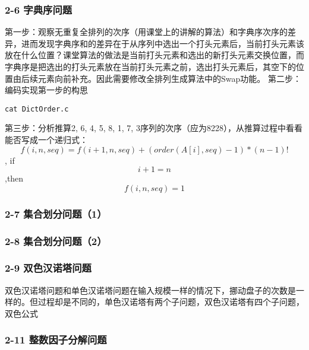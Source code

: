 \documentclass[11pt]{article}
\begin{document}
\subsubsection{2-6 字典序问题}
\label{sec-1-2-4}
    第一步：观察无重复全排列的次序（用课堂上的讲解的算法）和字典序次序的差异，进而发现字典序和的差异在于从序列中选出一个打头元素后，当前打头元素该放在什么位置？课堂算法的做法是当前打头元素和选出的新打头元素交换位置，而字典序是把选出的打头元素放在当前打头元素之前，选出打头元素后，其空下的位置由后续元素向前补充。因此需要修改全排列生成算法中的Swap功能。
第二步：编码实现第一步的构思
\begin{verbatim}
cat DictOrder.c
\end{verbatim}
第三步：分析推算2, 6, 4, 5, 8, 1, 7, 3序列的次序（应为8228），从推算过程中看看能否写成一个递归式：\[ f(i, n, seq) = f(i + 1, n, seq) + (order(A[i], seq) - 1) * (n - 1)!\], if \[i + 1 = n\] ,then \[f(i, n, seq) = 1 \]
\subsubsection{2-7 集合划分问题（1）}
\label{sec-1-2-5}

\subsubsection{2-8 集合划分问题（2）}
\label{sec-1-2-6}
\subsubsection{2-9 双色汉诺塔问题}
\label{sec-1-2-7}
双色汉诺塔问题和单色汉诺塔问题在输入规模一样的情况下，挪动盘子的次数是一样的。但过程却是不同的，单色汉诺塔有两个子问题，双色汉诺塔有四个子问题，双色公式\[\]
\subsubsection{2-11 整数因子分解问题}
\label{sec-1-2-8}
\end{document}

